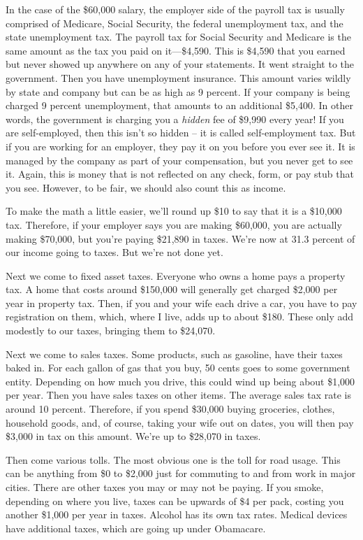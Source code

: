 In the case of the \$60,000 salary, the employer side of the payroll tax
is usually comprised of Medicare, Social Security, the federal
unemployment tax, and the state unemployment tax. The payroll tax for
Social Security and Medicare is the same amount as the tax you paid on
it—\$4,590. This is \$4,590 that you earned but never showed up
anywhere on any of your statements. It went straight to the government.
Then you have unemployment insurance. This amount varies wildly by
state and company but can be as high as 9 percent. If your company is
being charged 9 percent unemployment, that amounts to an additional
\$5,400. In other words, the government is charging you a
\textit{hidden} fee of \$9,990 every year!  If you are self-employed,
then this isn't so hidden – it is called
self-employment tax.  But if you are working for an employer, they pay
it on you before you ever see it.  It is managed by the company as part
of your compensation, but you never get to see it.  Again, this is
money that is not reflected on any check, form, or pay stub that you
see. However, to be fair, we should also count this as income.

To make the math a little easier, we’ll round up \$10 to say that it is
a \$10,000 tax. Therefore, if your employer says you are making
\$60,000, you are actually making \$70,000, but you’re paying \$21,890
in taxes. We’re now at 31.3 percent of our income going to taxes. But
we’re not done yet.

Next we come to fixed asset taxes. Everyone who owns a home pays a
property tax. A  home that costs around \$150,000 will generally get
charged \$2,000 per year in property tax. Then, if you and your wife
each drive a car, you have to pay registration on them, which, where I
live, adds up to about \$180. These only add modestly to our taxes,
bringing them to \$24,070.

Next we come to sales taxes. Some products, such as gasoline, have their
taxes baked in. For each gallon of gas that you buy, 50 cents goes to
some government entity. Depending on how much you drive, this could
wind up being about \$1,000 per year. Then you have sales taxes on
other items. The average sales tax rate is around 10 percent.
Therefore, if you
spend \$30,000 buying groceries, clothes, household goods, and, of
course, taking your wife out on
dates, you will then
pay \$3,000 in tax on this amount.
We’re up to \$28,070
in taxes. 

Then come various
tolls. The most obvious one is the toll for road usage. This can be
anything from \$0 to \$2,000 just for commuting to and from work in
major cities.  There are other taxes you may or may not be paying. If
you smoke, depending on where you live, taxes can be upwards of \$4 per
pack, costing you another \$1,000 per year in taxes. Alcohol has its
own tax rates. Medical devices have additional taxes, which are going
up under Obamacare.

